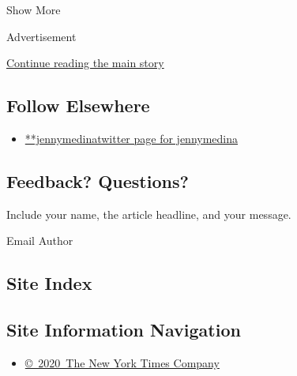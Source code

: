 Show More

Advertisement

\protect\hyperlink{after-mid2}{Continue reading the main story}

\hypertarget{follow-elsewhere}{%
\subsection{Follow Elsewhere}\label{follow-elsewhere}}

\begin{itemize}
\tightlist
\item
  \href{https://twitter.com/jennymedina}{**jennymedinatwitter page for
  jennymedina}
\end{itemize}

\hypertarget{feedback-questions}{%
\subsection{Feedback? Questions?}\label{feedback-questions}}

Include your name, the article headline, and your message.

Email Author

\hypertarget{site-index}{%
\subsection{Site Index}\label{site-index}}

\hypertarget{site-information-navigation}{%
\subsection{Site Information
Navigation}\label{site-information-navigation}}

\begin{itemize}
\tightlist
\item
  \href{https://help.nytimes3xbfgragh.onion/hc/en-us/articles/115014792127-Copyright-notice}{©~2020~The
  New York Times Company}
\end{itemize}

